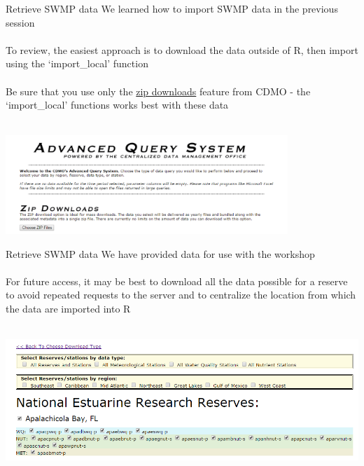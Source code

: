 \documentclass[xcolor=svgnames]{beamer}\usepackage[]{graphicx}\usepackage[]{color}
\begin{document}
\begin{frame}{Retrieve SWMP data}
We learned how to import SWMP data in the previous session \\~\\
To review, the easiest approach is to download the data outside of R, then import using the `import\_local' function \\~\\
Be sure that you use only the \href{http://cdmo.baruch.sc.edu/aqs/zips.cfm}{zip downloads} feature from CDMO - the `import\_local' functions works best with these data \\~\\
\centerline{\includegraphics[width = 0.8\textwidth]{adv_query.png}}
\end{frame}

\begin{frame}[t]{Retrieve SWMP data}
We have provided data for use with the workshop\\~\\
For future access, it may be best to download all the data possible for a reserve to avoid repeated requests to the server and to centralize the location from which the data are imported into R \\~\\
\centerline{\includegraphics[width = \textwidth]{zip_eda.png}}
\end{frame}
\end{document}
